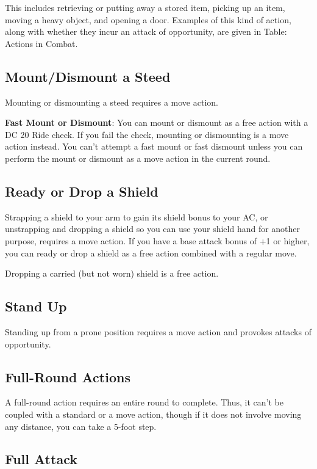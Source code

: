 This includes retrieving or putting away a stored item, picking up an item, moving a heavy object, and opening a door. Examples of this kind of action, along with whether they incur an attack of opportunity, are given in Table: Actions in Combat.
				
\subsection{Mount/Dismount a Steed}

				
Mounting or dismounting a steed requires a move action.
				
\textbf{Fast Mount or Dismount}: You can mount or dismount as a free action with a DC 20 Ride check. If you fail the check, mounting or dismounting is a move action instead. You can't attempt a fast mount or fast dismount unless you can perform the mount or dismount as a move action in the current round.
				
\subsection{Ready or Drop a Shield}

				
Strapping a shield to your arm to gain its shield bonus to your AC, or unstrapping and dropping a shield so you can use your shield hand for another purpose, requires a move action. If you have a base attack bonus of +1 or higher, you can ready or drop a shield as a free action combined with a regular move.
				
Dropping a carried (but not worn) shield is a free action.
				
\subsection{Stand Up}

				
Standing up from a prone position requires a move action and provokes attacks of opportunity.
				
\subsection{Full-Round Actions}

				
A full-round action requires an entire round to complete. Thus, it can't be coupled with a standard or a move action, though if it does not involve moving any distance, you can take a 5-foot step.
				
\subsection{Full Attack}


